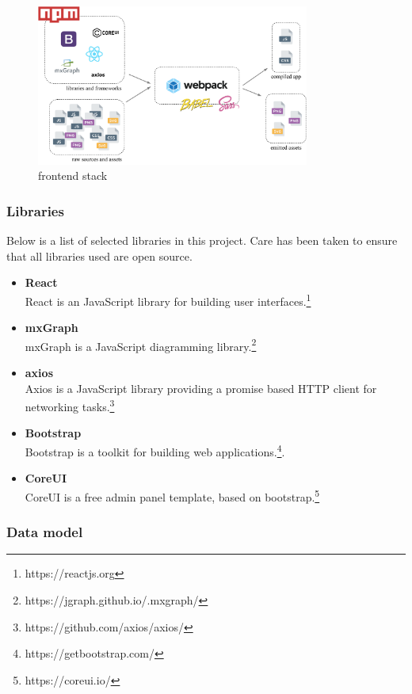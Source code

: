 \documentclass[a4paper,12pt,pdftex,halfparskip,cleardoubleempty,bibtotoc,liststotoc]{scrbook}
\begin{document}
\begin{figure}[H]
  \centering
  \vspace{0.8cm}
  \includegraphics[width=0.8\textwidth]{frontend-setup}
  \caption{frontend stack}
\end{figure}

\subsubsection{Libraries}
Below is a list of selected libraries in this project. Care has been taken to ensure that all libraries used are open source.
\begin{itemize}
\item \textbf{React}\\
React is an JavaScript library for building user interfaces.\footnote{https://reactjs.org}
\item \textbf{mxGraph}\\
mxGraph is a JavaScript diagramming library.\footnote{https://jgraph.github.io/.mxgraph/}
\item \textbf{axios}\\
Axios is a JavaScript library providing a promise based HTTP client for networking tasks.\footnote{https://github.com/axios/axios/}
\item \textbf{Bootstrap}\\
Bootstrap is a toolkit for building web applications.\footnote{https://getbootstrap.com/}.
\item \textbf{CoreUI}\\
CoreUI is a free admin panel template, based on bootstrap.\footnote{https://coreui.io/}
\end{itemize}


\subsubsection{Data model}
\end{document}
